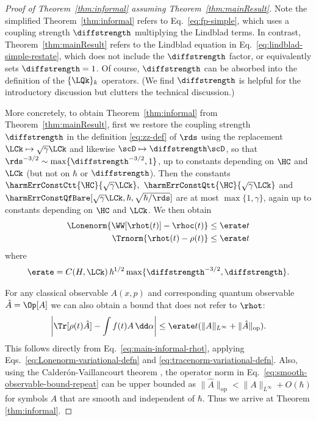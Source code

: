 \documentclass{article}
\numberwithin{equation}{section}
\begin{document}
\begin{proof}[Proof of Theorem~\ref{thm:informal} assuming Theorem~\ref{thm:mainResult}]
Note the simplified Theorem~\ref{thm:informal} refers to Eq.~\eqref{eq:fp-simple}, which uses a coupling strength $\diffstrength$ multiplying the Lindblad terms.  In contrast, Theorem~\ref{thm:mainResult} refers to the Lindblad equation in Eq.~\eqref{eq:lindblad-simple-restate}, which does not include the $\diffstrength$ factor, or equivalently sets $\diffstrength=1$.  Of course, $\diffstrength$ can be absorbed into the definition of the $\{\LQk\}_k$ operators. (We find $\diffstrength$ is helpful for the introductory discussion but clutters the technical discussion.)

More concretely, to obtain Theorem~\ref{thm:informal} from Theorem~\ref{thm:mainResult}, first we restore the coupling strength $\diffstrength$ in the definition \eqref{eq:zz-def} of $\rds$ using the replacement $\LCk \mapsto \sqrt{\gamma} \LCk$ and likewise $\scD\mapsto\diffstrength\scD$, so that  $\rds^{-3/2}\sim \max\{\diffstrength^{-3/2},1\}$, up to constants depending on $\HC$ and $\LCk$ (but not on $\hbar$ or $\diffstrength$). Then the constants $\harmErrConstCtt{\HC}{\sqrt{\gamma}\LCk},$ $\harmErrConstQtt{\HC}{\sqrt{\gamma}\LCk}$ and $\harmErrConstQfBare[\sqrt{\gamma}\LCk,\hbar,\sqrt{\hbar/\rds}]$ are at most $\max\{1,\gamma\}$, again up to constants depending on $\HC$ and $\LCk$.  We then obtain
\begin{align}\label{eq:main-informal-rhot}
\begin{split}
    \Lonenorm{\WW[\rhot(t)]-\rhoc(t)} &\le  
    \erate t
    \\ 
    \Trnorm{\rhot(t)-\rho(t)} &\le    
    \erate  t
\end{split}
\end{align}
where 
\begin{align}
   \erate = C(H, \LCk)\, \hbar^{1/2} 
   \max\{ \diffstrength^{-3/2}, \diffstrength\}.
\end{align}

For any classical observable $A(x,p)$ and 
corresponding quantum observable $\hat{A}=\Op[A]$
we can also obtain a bound
that does not refer to $\rhot$: 
\begin{equation} \label{eq:smooth-observable-bound-repeat}
\left|\Tr[\rho(t) \hat{A}] - \int f(t) A \, \dd \alpha\right| \leq 
\erate t (\|A\|_{L^\infty} +
\|\hat{A}\|_{\text{op}}).
\end{equation}
This follows directly from Eq.~\eqref{eq:main-informal-rhot}, applying  Eqs.~\eqref{eq:Lonenorm-variational-defn} and \eqref{eq:tracenorm-variational-defn}.  Also, using the 
 Calder{\'o}n-Vaillancourt theorem \cite{zworski2022semiclassical},
the operator norm in Eq.~\eqref{eq:smooth-observable-bound-repeat} can be upper bounded 
as $\|\hat{A}\|_{\text{op}} < \|A\|_{L^\infty} + O(\hbar)$ for symbols $A$ that are smooth and independent of $\hbar$. Thus we arrive at Theorem \ref{thm:informal}.
\end{proof}
\end{document}
